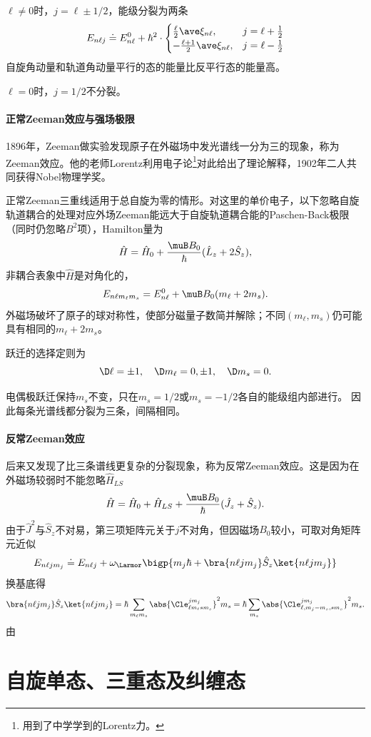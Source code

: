 $\ell\neq 0$时，$j=\ell\pm 1/2$，能级分裂为两条
\[
E_{n\ell j}\doteq E_{n\ell}^0+\hbar^2\cdot\begin{cases}
	\frac{\ell}2\ave\xi_{n\ell},& j=\ell+\frac12\\
	-\frac{\ell+1}2\ave\xi_{n\ell},& j=\ell-\frac12
\end{cases}
\]
自旋角动量和轨道角动量平行的态的能量比反平行态的能量高。

$\ell=0$时，$j=1/2$不分裂。
\paragraph{正常Zeeman效应与强场极限}1896年，Zeeman做实验发现原子在外磁场中发光谱线一分为三的现象，称为Zeeman效应。他的老师Lorentz利用电子论\footnote{用到了中学学到的Lorentz力。}对此给出了理论解释，1902年二人共同获得Nobel物理学奖。

正常Zeeman三重线适用于总自旋为零的情形。对这里的单价电子，以下忽略自旋轨道耦合的处理对应外场Zeeman能远大于自旋轨道耦合能的Paschen-Back极限（同时仍忽略$B^2$项），Hamilton量为
\[
	\hat H=\hat H_0+\frac{\muB B_0}\hbar(\hat L_z+2\hat S_z),
\]
非耦合表象中$\hat H$是对角化的，
\[
E_{n\ell m_\ell m_s}=E_{n\ell}^0+\muB B_0(m_\ell+2m_s).
\]
外磁场破坏了原子的球对称性，使部分磁量子数简并解除；不同$(m_\ell,m_s)$仍可能具有相同的$m_\ell+2m_s$。%

跃迁的选择定则为
\[
	\D\ell=\pm 1,\quad \D m_\ell=0,\pm 1,\quad \D m_s=0.
\]
\begin{remark}
	电偶极跃迁保持$m_s$不变，只在$m_s=1/2$或$m_s=-1/2$各自的能级组内部进行。
	因此每条光谱线都分裂为三条，间隔相同。
\end{remark}
\paragraph{反常Zeeman效应}
后来又发现了比三条谱线更复杂的分裂现象，称为反常Zeeman效应。这是因为在外磁场较弱时不能忽略$\hat H_{LS}$
\[
	\hat H=\hat H_0+\hat H_{LS}+\frac{\muB B_0}\hbar(\hat J_z+\hat S_z).
\]
由于$\hat J^2$与$\hat S_z$不对易，第三项矩阵元关于$j$不对角，但因磁场$B_0$较小，可取对角矩阵元近似
\[
E_{n\ell jm_j}\doteq E_{n\ell j}+\omega_\Larmor\bigp{m_j\hbar+\bra{n\ell jm_j}\hat S_z\ket{n\ell jm_j}}
\]
换基底得
\[
	\bra{n\ell jm_j}\hat S_z\ket{n\ell jm_j}=\hbar\sum_{m_\ell m_s}\abs{\Cle_{\ell m_\ell sm_s}^{jm_j}}^2m_s=\hbar\sum_{m_s}\abs{\Cle_{\ell,m_j-m_s,sm_s}^{jm_j}}^2m_s.
\]
由
\section{自旋单态、三重态及纠缠态}
